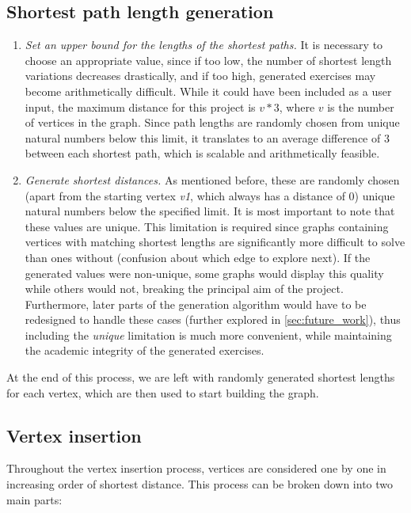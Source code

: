 \documentclass{l4proj}
\begin{document}
\subsection{Shortest path length generation}
\label{sec:shortestpathdesign}
\begin{enumerate}[i]
	\item
	\emph{Set an upper bound for the lengths of the shortest paths.} It is necessary to choose an appropriate value, since if too low, the number of shortest length variations decreases drastically, and if too high, generated exercises may become arithmetically difficult. While it could have been included as a user input, the maximum distance for this project is $v*3$, where $v$ is the number of vertices in the graph. Since path lengths are randomly chosen from unique natural numbers below this limit, it translates to an average difference of $3$ between each shortest path, which is scalable and arithmetically feasible.

	\item
	\emph{Generate shortest distances.} As mentioned before, these are randomly chosen (apart from the starting vertex \emph{v1}, which always has a distance of $0$) unique natural numbers below the specified limit. It is most important to note that these values are unique. This limitation is required since graphs containing vertices with matching shortest lengths are significantly more difficult to solve than ones without (confusion about which edge to explore next). If the generated values were non-unique, some graphs would display this quality while others would not, breaking the principal aim of the project. Furthermore, later parts of the generation algorithm would have to be redesigned to handle these cases (further explored in \autoref{sec:future_work}), thus including the \emph{unique} limitation is much more convenient, while maintaining the academic integrity of the generated exercises.
\end{enumerate}

At the end of this process, we are left with randomly generated shortest lengths for each vertex, which are then used to start building the graph.

\subsection{Vertex insertion}
\label{sec:vi}

Throughout the vertex insertion process, vertices are considered one by one in increasing order of shortest distance. This process can be broken down into two main parts:
\end{document}
